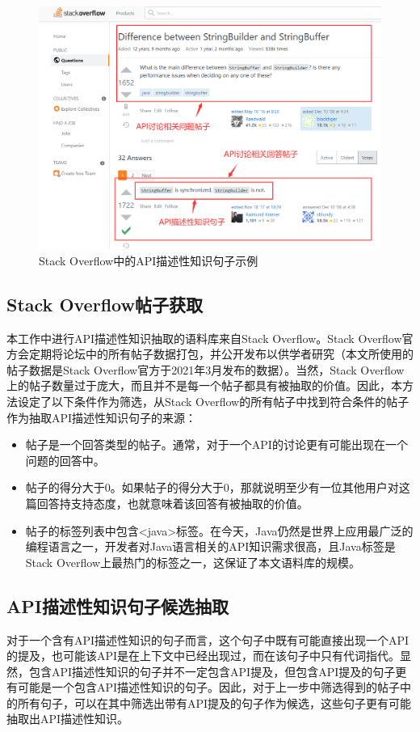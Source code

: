 \begin{figure}[htb]
    \centering
    \includegraphics[width=\textwidth]{image/so.png}
    \caption{Stack Overflow中的API描述性知识句子示例} 
    \label{图3-3} 
\end{figure}

\subsection{Stack Overflow帖子获取}
本工作中进行API描述性知识抽取的语料库来自Stack Overflow。Stack Overflow官方会定期将论坛中的所有帖子数据打包，并公开发布以供学者研究（本文所使用的帖子数据是Stack Overflow官方于2021年3月发布的数据）。当然，Stack Overflow上的帖子数量过于庞大，而且并不是每一个帖子都具有被抽取的价值。因此，本方法设定了以下条件作为筛选，从Stack Overflow的所有帖子中找到符合条件的帖子作为抽取API描述性知识句子的来源：

\begin{itemize}
    \item 帖子是一个回答类型的帖子。通常，对于一个API的讨论更有可能出现在一个问题的回答中。
    \item 帖子的得分大于0。如果帖子的得分大于0，那就说明至少有一位其他用户对这篇回答持支持态度，也就意味着该回答有被抽取的价值。
    \item 帖子的标签列表中包含<java>标签。在今天，Java仍然是世界上应用最广泛的编程语言之一，开发者对Java语言相关的API知识需求很高，且Java标签是Stack Overflow上最热门的标签之一，这保证了本文语料库的规模。
\end{itemize}

\subsection{API描述性知识句子候选抽取}
对于一个含有API描述性知识的句子而言，这个句子中既有可能直接出现一个API的提及，也可能该API是在上下文中已经出现过，而在该句子中只有代词指代。显然，包含API描述性知识的句子并不一定包含API提及，但包含API提及的句子更有可能是一个包含API描述性知识的句子。因此，对于上一步中筛选得到的帖子中的所有句子，可以在其中筛选出带有API提及的句子作为候选，这些句子更有可能抽取出API描述性知识。

